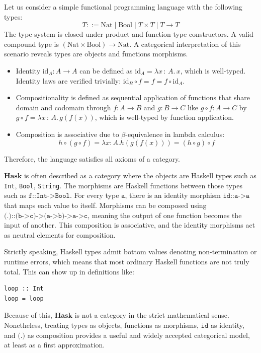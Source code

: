 \begin{example}
  Let us consider a simple functional
  programming language with the following types:
  \[
    T ::= \mathrm{Nat} \mid \mathrm{Bool} \mid T \times T \mid T \to T
  \]
  The type system is closed under product and function type
  constructors. A valid compound type is \( (\mathrm{Nat} \times \mathrm{Bool}) \to \mathrm{Nat} \).
  A categorical interpretation of this scenario reveals types are objects and functions morphisms.
  \begin{itemize}
  \item Identity \(\mathrm{id}_A : A \to A\) can be defined as \( \mathrm{id}_A = \lambda x\,{:}\,A . \, x  \), which is well-typed. Identity laws are verified trivially: \( \mathrm{id}_B \circ f = f = f \circ \mathrm{id}_A \).
  \item Compositionality is defined as sequential application of functions that share domain and codomain through \(f : A \to B\) and \(g : B \to C\) like \(g \circ f : A \to C\) by \(g \circ f = \lambda x\,{:}\,A . \, g (f(x))\), which is well-typed by function application.
  \item Composition is associative due to \(\beta\)-equivalence in lambda calculus:
    \[
      h \circ (g \circ f) = \lambda x{:}A . h (g (f(x))) = (h \circ g) \circ f
    \]
  \end{itemize}
  Therefore, the language satisfies all axioms of a category.
\end{example}

\begin{example}
  $\mathbf{Hask}$ is often described as a category where the objects are Haskell types such as
\texttt{Int}, \texttt{Bool}, \texttt{String}.
The morphisms are Haskell functions between those types such as 
\(\texttt{f::Int->Bool}\). 
For every type \(\texttt{a}\), there is an identity morphism 
\(\texttt{id::a->a}\) that maps each value to itself. 
Morphisms can be composed using 
\(\texttt{(.)::(b->c)->(a->b)->a->c}\), 
meaning the output of one function becomes the input of another. 
This composition is associative, and the identity morphisms act as neutral elements for composition.

Strictly speaking, Haskell types admit bottom values denoting non-termination or runtime errors, which means that most ordinary Haskell functions are not truly total. This can show up in definitions like:

\begin{verbatim}
loop :: Int
loop = loop
\end{verbatim}

Because of this, \(\mathbf{Hask}\) is not a category in the strict mathematical sense.
Nonetheless, treating types as objects, functions as morphisms, \small{\(\texttt{id}\)} as identity, and \small{\(\texttt{(.)}\)} as composition provides a useful and widely accepted categorical model, at least as a first approximation.

\end{example}

